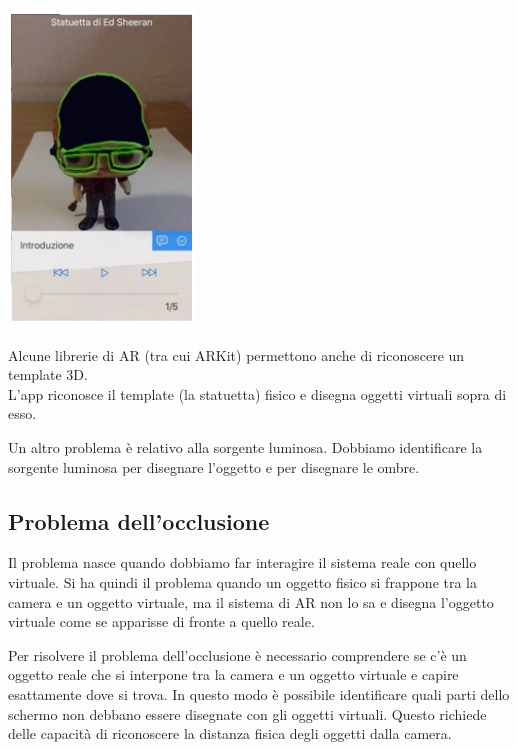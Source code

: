 \begin{minipage}{.6\textwidth}
    \begin{center}
        \includegraphics[width=.4\textwidth]{images/MobiDEV/4. augmented reality (display e interaction)/template 3D.PNG}
    \end{center}
\end{minipage}
\hfill
\begin{minipage}{.4\textwidth}
   Alcune librerie di AR (tra cui ARKit) permettono anche di riconoscere un template 3D.
   \\ L'app riconosce il template (la statuetta) fisico e disegna oggetti virtuali sopra di esso.
\end{minipage} 


Un altro problema è relativo alla sorgente luminosa. 
Dobbiamo identificare la sorgente luminosa per disegnare l'oggetto e per disegnare le ombre. 

\subsection{Problema dell'occlusione}
Il problema nasce quando dobbiamo far interagire il sistema reale con quello virtuale.
Si ha quindi il problema quando un oggetto fisico si frappone tra la camera e un oggetto virtuale, ma il sistema di AR non lo sa e disegna l'oggetto virtuale come se apparisse di fronte a quello reale.

Per risolvere il problema dell'occlusione è necessario comprendere se c'è un oggetto reale che si interpone tra la camera e un oggetto virtuale e capire esattamente dove si trova. In questo modo è possibile identificare quali parti dello schermo non debbano essere disegnate con gli oggetti virtuali.
Questo richiede delle capacità di riconoscere la distanza fisica degli oggetti dalla camera.

